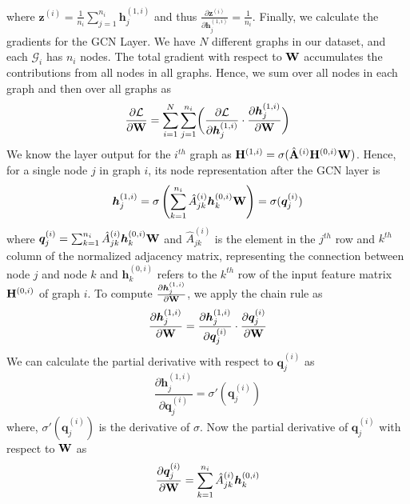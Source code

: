 \documentclass[aps, prd, showpacs, floatfix, superscriptaddress, twocolumn, nofootinbib, preprintnumbers, longbibliography]{revtex4-2}
\begin{document}
where $ \bm{z}^{(i)} = \frac{1}{n_i}\sum_{j=1}^{n_i} \bm{h}^{(1,i)}_j$ and thus $\frac{\partial \bm{z}^{(i)}}{\partial \bm{h}^{(1,i)}_j}=\frac{1}{n_i}$. 
%
Finally, we calculate the gradients for the GCN Layer. We have $N$ different graphs in our dataset, and each $\mathcal{G}_i$ has $n_i$ nodes. The total gradient with respect to ${\bf W}$ accumulates the contributions from all nodes in all graphs. Hence, we sum over all nodes in each graph and then over all graphs as 
\begin{equation}\label{ap_f}
\frac{\partial \mathcal{L}}{\partial {\bf W}} = \sum_{i=1}^N \sum_{j=1}^{n_i} \biggl(\frac{\partial \mathcal{L}}{\partial \bm{h}^{(1,i)}_j} \cdot \frac{\partial \bm{h}^{(1,i)}_j}{\partial {\bf W}}\biggr)    
\end{equation}
We know the layer output for the $i^{th}$ graph as ${\bf H}^{(1,i)} = \sigma(\hat{\bf A}^{(i)} {\bf H}^{(0,i)} {\bf W})$. Hence, for a single node $j$ in graph $i$, its node representation after the GCN layer is 
\begin{equation}\nonumber
\bm{h}^{(1,i)}_j = \sigma\left(\sum_{k=1}^{n_i} \hat{A}^{(i)}_{jk} \bm{h}^{(0,i)}_k {\bf W}\right)= \sigma(\bm{q}^{(i)}_j) 
\end{equation}
where $\bm{q}^{(i)}_j = \sum_{k=1}^{n_i} \hat{A}^{(i)}_{jk} \bm{h}^{(0,i)}_k {\bf W}$ and $\hat{A}^{(i)}_{jk}$ is the element in the $j^{th}$ row and $k^{th}$ column of the normalized adjacency matrix, representing the connection between node $j$ and node $k$ and $\bm{h}^{(0,i)}_k$ refers to the $k^{th}$ row of the input feature matrix \( {\bf H}^{(0,i)} \) of graph \( i \). To compute \(\frac{\partial \bm{h}^{(1,i)}_j}{\partial {\bf W}}\), we apply the chain rule as 
\begin{equation}\nonumber
\frac{\partial \bm{h}^{(1,i)}_j}{\partial {\bf W}} = \frac{\partial \bm{h}^{(1,i)}_j}{\partial \bm{q}^{(i)}_j} \cdot \frac{\partial \bm{q}^{(i)}_j}{\partial {\bf W}}
\end{equation}
We can calculate the partial derivative with respect to $\bm{q}^{(i)}_j$ as 
\begin{equation}\nonumber
\frac{\partial \bm{h}^{(1,i)}_j}{\partial \bm{q}^{(i)}_j} = \sigma'\left(\bm{q}^{(i)}_j\right)    
\end{equation}
where, $\sigma'(\bm{q}^{(i)}_j)$ is the derivative of $\sigma$. Now the partial derivative of $\bm{q}^{(i)}_j$ with respect to ${\bf W}$ as 
\begin{equation}\nonumber
\frac{\partial \bm{q}^{(i)}_j}{\partial {\bf W}} = \sum_{k=1}^{n_i} \hat{A}^{(i)}_{jk} \bm{h}^{(0,i)}_k    
\end{equation}
\end{document}
